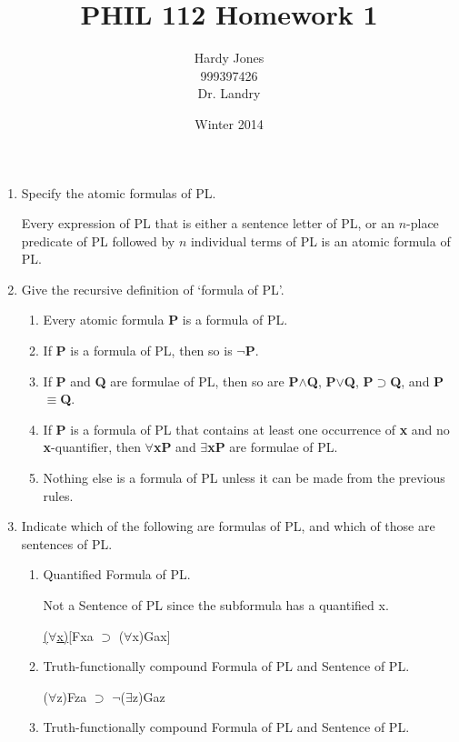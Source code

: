 \documentclass[12pt,letterpaper]{article}
\title{PHIL 112 Homework 1\vspace{-2ex}}
\author{Hardy Jones\\
        999397426\\
        Dr. Landry\vspace{-2ex}}
\date{Winter 2014}
\begin{document}
  \maketitle

  \begin{enumerate}
    \item
      Specify the atomic formulas of PL.

      Every expression of PL that is either a sentence letter of PL, or
      an $n$-place predicate of PL followed by $n$ individual terms of PL is an atomic formula of PL.

    \item
      Give the recursive definition of `formula of PL'.

      \begin{enumerate}
        \item Every atomic formula \textbf{P} is a formula of PL.
        \item If \textbf{P} is a formula of PL, then so is $\neg$\textbf{P}.
        \item If \textbf{P} and \textbf{Q} are formulae of PL,
          then so are \textbf{P}$\land$\textbf{Q}, \textbf{P}$\lor$\textbf{Q},
          \textbf{P}$\supset$\textbf{Q}, and \textbf{P}$\equiv$\textbf{Q}.
        \item If \textbf{P} is a formula of PL that contains at least one occurrence of \textbf{x} and no \textbf{x}-quantifier,
          then $\forall$\textbf{xP} and $\exists$\textbf{xP} are formulae of PL.
        \item Nothing else is a formula of PL unless it can be made from the previous rules.
      \end{enumerate}

    \item
      Indicate which of the following are formulas of PL, and which of those are sentences of PL.

      \begin{enumerate}
        \item
          Quantified Formula of PL.

          Not a Sentence of PL since the subformula has a quantified x.

          \underline{($\forall$x)}[Fxa $\supset$ ($\forall$x)Gax]
        \item
          Truth-functionally compound Formula of PL and Sentence of PL.

          ($\forall$z)Fza \underline{$\supset$} $\neg$($\exists$z)Gaz
        \item
          Truth-functionally compound Formula of PL and Sentence of PL.


\end{enumerate}
\end{enumerate}
\end{document}
